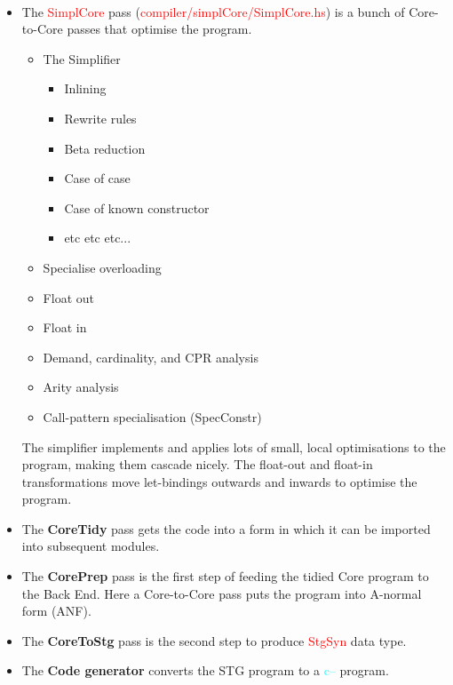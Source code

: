 \documentclass{article}
\begin{document}
	\paragraph{}
	\begin{itemize}
		\item The \textcolor{red}{SimplCore} pass (\textcolor{red}{compiler/simplCore/SimplCore.hs}) is a bunch of Core-to-Core passes that optimise the program.
		\begin{itemize}
			\item The Simplifier
			\begin{itemize}
				\item Inlining
				\item Rewrite rules
				\item Beta reduction
				\item Case of case
				\item Case of known constructor
				\item etc etc etc...
			\end{itemize}
			\item Specialise overloading
			\item Float out
			\item Float in
			\item Demand, cardinality, and CPR analysis
			\item Arity analysis
			\item Call-pattern specialisation (SpecConstr)
		\end{itemize}
		The simplifier implements and applies lots of small, local optimisations to the program, making them cascade nicely. The float-out and float-in transformations move let-bindings outwards and inwards to optimise the program.
		\item The \textbf{CoreTidy} pass gets the code into a form in which it can be imported into subsequent modules.
		\item The \textbf{CorePrep} pass is the first step of feeding the tidied Core program to the Back End. Here a Core-to-Core pass puts the program into A-normal form (ANF).
		\item The \textbf{CoreToStg} pass is the second step to produce \textcolor{red}{StgSyn} data type.
		\item The \textbf{Code generator} converts the STG program to a \textcolor{cyan}{c--} program.
	\end{itemize}
\end{document}
